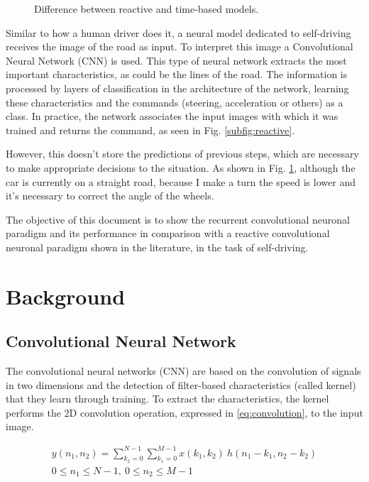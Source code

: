 \documentclass[conference]{IEEEtran}
\begin{document}
\begin{figure}[h]
\begin{subfigure}{0.22\textwidth}
		\label{subfig:recurrent}
	\end{subfigure}
	\caption{Difference between reactive and time-based models.} 
	\label{fig:comparsion}
\end{figure}

Similar to how a human driver does it, a neural model dedicated to self-driving receives the image of the road as input. To interpret this image a Convolutional Neural Network (CNN) is used. This type of neural network extracts the most important characteristics, as could be the lines of the road. The information is processed by layers of classification in the architecture of the network, learning these characteristics and the commands (steering, acceleration or others) as a class. In practice, the network associates the input images with which it was trained and returns the command, as seen in Fig. \ref{subfig:reactive}.

However, this doesn't store the predictions of previous steps, which are necessary to make appropriate decisions to the situation. As shown in Fig. \ref{subfig:recurrent}, although the car is currently on a straight road, because I make a turn the speed is lower and it's necessary to correct the angle of the wheels.

The objective of this document is to show the recurrent convolutional neuronal paradigm and its performance in comparison with a reactive convolutional neuronal paradigm shown in the literature, in the task of self-driving.


\section{Background}

\subsection{Convolutional Neural Network}

The convolutional neural networks (CNN) are based on the convolution of signals in two dimensions and the detection of filter-based characteristics (called kernel) that they learn through training. To extract the characteristics, the kernel performs the 2D convolution operation, expressed in \eqref{eq:convolution}, to the input image. 

\begin{equation}
\begin{split}
y(n_1, n_2) = \sum_{k_2=0}^{N-1} \sum_{k_1=0}^{M-1} x(k_1, k_2)\ h(n_1 - k_1, n_2 - k_2)\\
0 \leq n_1 \leq N-1,\ 0 \leq n_2 \leq M - 1
\end{split}
\label{eq:convolution}
\end{equation}
\end{document}
